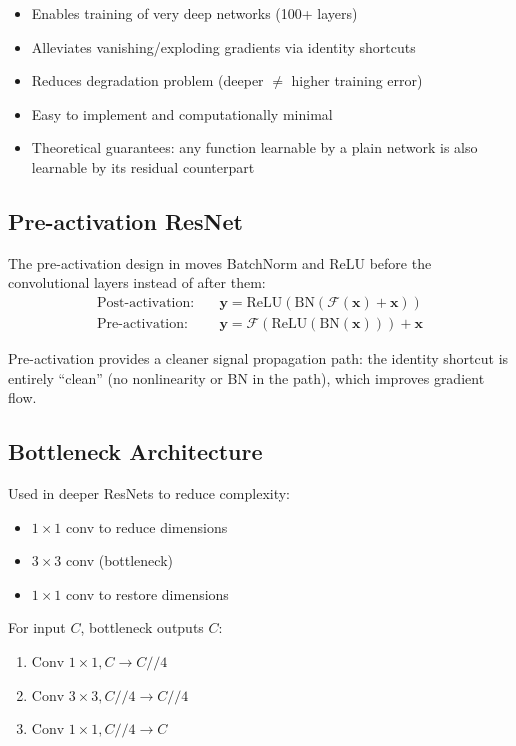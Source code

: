 \begin{properties}
\begin{itemize}
    \item Enables training of very deep networks (100+ layers)
    \item Alleviates vanishing/exploding gradients via identity shortcuts
    \item Reduces degradation problem (deeper $\neq$ higher training error)
    \item Easy to implement and computationally minimal
    \item Theoretical guarantees: any function learnable by a plain network is also learnable by its residual counterpart
\end{itemize}
\end{properties}

\subsection{Pre-activation ResNet}

The pre-activation design in \cite{he2016identity} moves BatchNorm and ReLU before the convolutional layers instead of after them:
\begin{align}
\text{Post-activation:} \quad &\mathbf{y} = \text{ReLU}(\text{BN}(\mathcal{F}(\mathbf{x}) + \mathbf{x})) \\
\text{Pre-activation:} \quad &\mathbf{y} = \mathcal{F}(\text{ReLU}(\text{BN}(\mathbf{x}))) + \mathbf{x}
\end{align}

Pre-activation provides a cleaner signal propagation path: the identity shortcut is entirely ``clean'' (no nonlinearity or BN in the path), which improves gradient flow.

\subsection{Bottleneck Architecture}

Used in deeper ResNets to reduce complexity:
\begin{itemize}
    \item $1\times1$ conv to reduce dimensions
    \item $3\times3$ conv (bottleneck)
    \item $1\times1$ conv to restore dimensions
\end{itemize}

For input $C$, bottleneck outputs $C$:
\begin{enumerate}
    \item $\text{Conv }1\times1, C \rightarrow C//4$
    \item $\text{Conv }3\times3, C//4 \rightarrow C//4$
    \item $\text{Conv }1\times1, C//4 \rightarrow C$
\end{enumerate}

